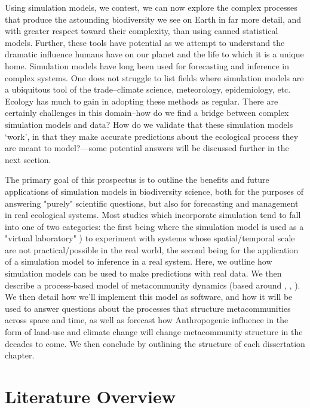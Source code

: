 \documentclass[]{article}
\begin{document}
Using simulation models, we contest, we can now explore the complex processes that produce the astounding biodiversity we see on Earth in far more detail, and with greater respect toward their complexity, than using canned statistical models.
Further, these tools have potential as we attempt to understand the dramatic influence humans have on our planet and the life to which it is a unique home.
Simulation models have long been used for forecasting and inference in complex systems.
One does not struggle to list fields where simulation models are a ubiquitous tool of the trade--climate science,
meteorology, epidemiology, etc.
Ecology has much to gain in adopting these methods as regular.
There are certainly challenges in this domain--how do we find a bridge between complex simulation models and data?
How do we validate that these simulation models `work', in that they make accurate predictions about the ecological process they are meant to model?---some potential answers will be discussed further in the next section.

The primary goal of this prospectus is to outline the benefits and future applications of simulation models in biodiversity science, both for the purposes of answering "purely" scientific questions, but also for forecasting and management in real ecological systems.
Most studies which incorporate simulation tend to fall into one of two categories: the first being where the simulation model is used as a "virtual laboratory" \citep{railsback_agent-based_2011}) to experiment with systems
whose spatial/temporal scale are not practical/possible in the real world, the second being for the application of a simulation model to inference in a real system.
Here, we outline how simulation models can be used to make predictions with real data. We then describe a
process-based model of metacommunity dynamics (based around
\citep{poisot_beyond_2015} , \citep{vellend_conceptual_2010}, \citep{thompson_process-based_2020}). We then detail how we'll implement this model as
software, and how it will be used to answer questions about the
processes that structure metacommunities across space and time, as well
as forecast how Anthropogenic influence in the form of land-use and
climate change will change metacommunity structure in the decades to
come. We then conclude by outlining the structure of each dissertation
chapter.

\pagebreak


%
%
%
\hypertarget{literature-overview}{%
\section{Literature Overview}\label{literature-overview}}
\end{document}
